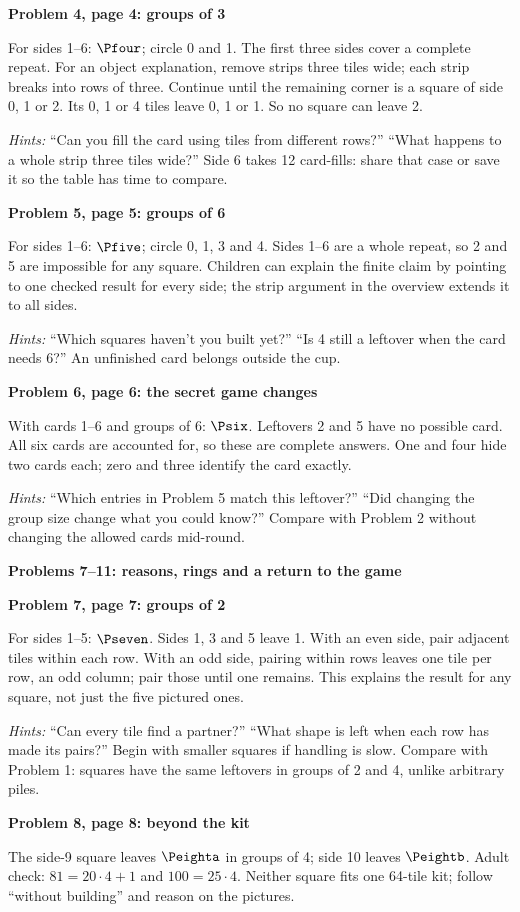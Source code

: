 \documentclass[11pt]{article}
\newcommand{\head}[1]{\par\textbf{\large #1}\par}
\newcommand{\sub}[1]{\par\textbf{#1}\par}
\begin{document}
\sub{Problem 4, page 4: groups of 3}
For sides 1--6: $\Pfour$; circle 0 and 1. The first three sides cover a complete repeat. For an object explanation, remove strips three tiles wide; each strip breaks into rows of three. Continue until the remaining corner is a square of side 0, 1 or 2. Its 0, 1 or 4 tiles leave 0, 1 or 1. So no square can leave 2.

\textit{Hints:} ``Can you fill the card using tiles from different rows?'' ``What happens to a whole strip three tiles wide?'' Side 6 takes 12 card-fills: share that case or save it so the table has time to compare.

\sub{Problem 5, page 5: groups of 6}
For sides 1--6: $\Pfive$; circle 0, 1, 3 and 4. Sides 1--6 are a whole repeat, so 2 and 5 are impossible for any square. Children can explain the finite claim by pointing to one checked result for every side; the strip argument in the overview extends it to all sides.

\textit{Hints:} ``Which squares haven't you built yet?'' ``Is 4 still a leftover when the card needs 6?'' An unfinished card belongs outside the cup.

\sub{Problem 6, page 6: the secret game changes}
With cards 1--6 and groups of 6: $\Psix$. Leftovers 2 and 5 have no possible card. All six cards are accounted for, so these are complete answers. One and four hide two cards each; zero and three identify the card exactly.

\textit{Hints:} ``Which entries in Problem 5 match this leftover?'' ``Did changing the group size change what you could know?'' Compare with Problem 2 without changing the allowed cards mid-round.

\newpage
\head{Problems 7--11: reasons, rings and a return to the game}
\sub{Problem 7, page 7: groups of 2}
For sides 1--5: $\Pseven$. Sides 1, 3 and 5 leave 1. With an even side, pair adjacent tiles within each row. With an odd side, pairing within rows leaves one tile per row, an odd column; pair those until one remains. This explains the result for any square, not just the five pictured ones.

\textit{Hints:} ``Can every tile find a partner?'' ``What shape is left when each row has made its pairs?'' Begin with smaller squares if handling is slow. Compare with Problem 1: squares have the same leftovers in groups of 2 and 4, unlike arbitrary piles.

\sub{Problem 8, page 8: beyond the kit}
The side-9 square leaves $\Peighta$ in groups of 4; side 10 leaves $\Peightb$. Adult check: $81=20\cdot4+1$ and $100=25\cdot4$. Neither square fits one 64-tile kit; follow ``without building'' and reason on the pictures.
\end{document}
